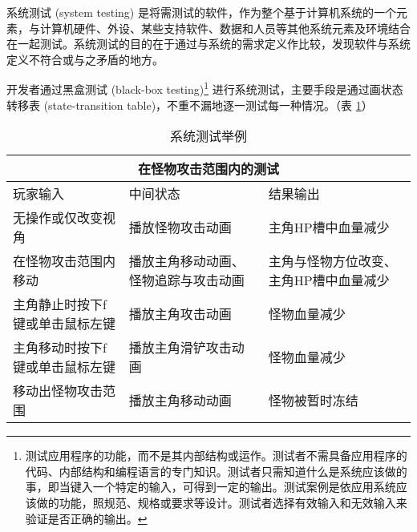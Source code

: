 系统测试 (system testing) 是将需测试的软件，作为整个基于计算机系统的一个元素，与计算机硬件、外设、某些支持软件、数据和人员等其他系统元素及环境结合在一起测试。系统测试的目的在于通过与系统的需求定义作比较，发现软件与系统定义不符合或与之矛盾的地方。\cite{systestwiki}

开发者通过黑盒测试 (black-box testing)\footnote{测试应用程序的功能，而不是其内部结构或运作。测试者不需具备应用程序的代码、内部结构和编程语言的专门知识。测试者只需知道什么是系统应该做的事，即当键入一个特定的输入，可得到一定的输出。测试案例是依应用系统应该做的功能，照规范、规格或要求等设计。测试者选择有效输入和无效输入来验证是否正确的输出。} 进行系统测试，主要手段是通过画状态转移表 (state-transition table)，不重不漏地逐一测试每一种情况。（表 \ref{tab:testing}）

\begin{table}[htbp]
\centering
\caption{系统测试举例}
\label{tab:testing}
\begin{tabular}{ |p{3.75cm}|p{3.75cm}|p{3.75cm}|  }
\hline
\multicolumn{3}{|c|}{在怪物攻击范围内的测试}\\
\hline
玩家输入&中间状态&结果输出\\
\hline
无操作或仅改变视角&播放怪物攻击动画&主角HP槽中血量减少\\
在怪物攻击范围内移动&播放主角移动动画、怪物追踪与攻击动画&主角与怪物方位改变、主角HP槽中血量减少\\
主角静止时按下f键或单击鼠标左键&播放主角攻击动画&怪物血量减少\\
主角移动时按下f键或单击鼠标左键&播放主角滑铲攻击动画&怪物血量减少\\
移动出怪物攻击范围&播放主角移动动画&怪物被暂时冻结\\
\hline
\end{tabular}
\end{table}
